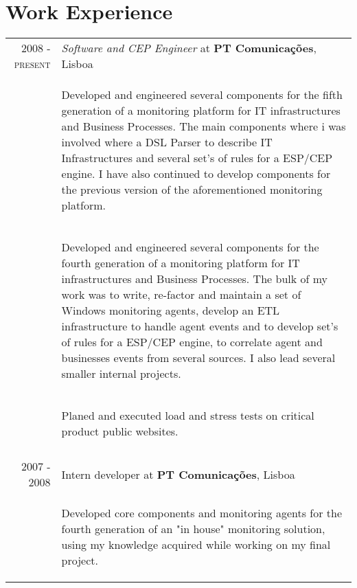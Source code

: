 \documentclass[a4paper,10pt]{article}
\begin{document}
\section{Work Experience}
\begin{tabular}{rp{11cm}}
  \textsc{2008 - present} & \emph{Software and CEP Engineer} at \textbf{PT Comunicações}, Lisboa\\ 
  & \begin{compactitem} 
     \item Developed and engineered several components for the fifth generation of a monitoring platform for IT infrastructures and Business Processes. The main components where i was involved
     where a DSL Parser to describe IT Infrastructures and several set's of rules for a ESP/CEP engine. I have also continued to develop components for the previous version of the aforementioned
     monitoring platform.
     \end{compactitem}\vspace{-1em} \\
  & \begin{compactitem} 
     \item Developed and engineered several components for the fourth generation of a monitoring platform for IT infrastructures and Business Processes.
     The bulk of my work was to write, re-factor and maintain a set of Windows monitoring agents, develop an ETL infrastructure to handle agent events and to develop set's of rules for a ESP/CEP 
     engine,  to correlate agent and businesses events from several sources. I also lead several smaller internal projects.
     \end{compactitem}\vspace{-1em} \\
  & \begin{compactitem} 
     \item Planed and executed load and stress tests on critical product public websites.
     \end{compactitem}\vspace{-1em} \\
\multicolumn{2}{c}{} \\
  \textsc{2007 - 2008} & Intern developer at \textbf{PT Comunicações}, Lisboa\\ 
   & \begin{compactitem}
   \item Developed core components and monitoring agents for the fourth generation of an "in house" monitoring solution, using my knowledge acquired while working on my final project.

\end{compactitem}
\end{tabular}
\end{document}
